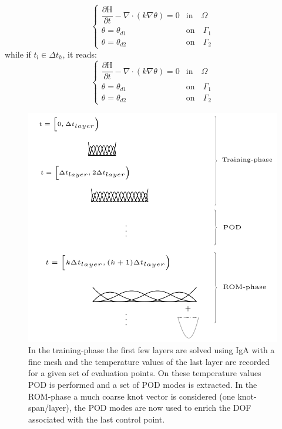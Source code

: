 \documentclass[3p]{article}
\begin{document}
\begin{equation}
\begin{cases}
    \dfrac{\partial\mathrm{H}}{\partial t}-\nabla \cdot (k\nabla\theta)=0 & \text{in}\quad \Omega \\
 	\theta = \theta_{d1} & \text{on}\quad \Gamma_{1} \\
 	\theta = \theta_{d2} & \text{on}\quad \Gamma_{2} 
\end{cases}
\label{PoissonTransientProblemHeatingPhase}
\end{equation}
while if $t_{l}\in \Delta t_{h}$, it reads:
\begin{equation}
\begin{cases}
    \dfrac{\partial\mathrm{H}}{\partial t}-\nabla \cdot (k\nabla\theta)=0 & \text{in}\quad \Omega \\
 	\theta = \theta_{d1} & \text{on}\quad \Gamma_{1} \\
 	\theta = \theta_{d2} & \text{on}\quad \Gamma_{2} 
\end{cases}
\label{PoissonTransientProblemCoolingPhase}
\end{equation}

\begin{figure}[h!]
\centering
\includegraphics[width=0.8\linewidth]{externals/Pictures/PODXIGAScheme.pdf}
\caption{In the training-phase the first few layers are solved using IgA with a fine mesh and the temperature values of the last layer are recorded for a given set of evaluation points. On these temperature values POD is performed and a set of POD modes is extracted. In the ROM-phase a much coarse knot vector is considered (one knot-span/layer), the POD modes are now used to enrich the DOF associated with the last control point.}
\label{PODXIGAScheme}
\end{figure}
\end{document}

